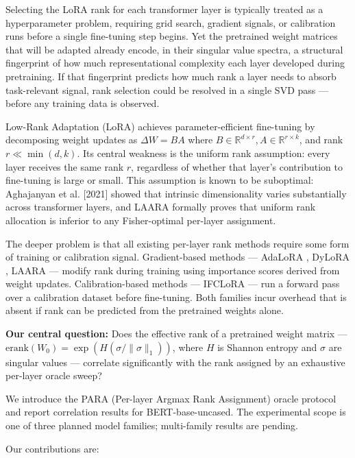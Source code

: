 
Selecting the LoRA rank for each transformer layer is typically treated as a hyperparameter problem, requiring grid search, gradient signals, or calibration runs before a single fine-tuning step begins. Yet the pretrained weight matrices that will be adapted already encode, in their singular value spectra, a structural fingerprint of how much representational complexity each layer developed during pretraining. If that fingerprint predicts how much rank a layer needs to absorb task-relevant signal, rank selection could be resolved in a single SVD pass --- before any training data is observed.

Low-Rank Adaptation (LoRA) \citep{Hu2022LoRA} achieves parameter-efficient fine-tuning by decomposing weight updates as $\Delta W = BA$ where $B \in \mathbb{R}^{d \times r}, A \in \mathbb{R}^{r \times k}$, and rank $r \ll \min(d, k)$. Its central weakness is the uniform rank assumption: every layer receives the same rank $r$, regardless of whether that layer's contribution to fine-tuning is large or small. This assumption is known to be suboptimal: Aghajanyan et al. [2021] showed that intrinsic dimensionality varies substantially across transformer layers, and LAARA \citep{Tripathi2026LAARA} formally proves that uniform rank allocation is inferior to any Fisher-optimal per-layer assignment.

The deeper problem is that all existing per-layer rank methods require some form of training or calibration signal. Gradient-based methods --- AdaLoRA \citep{Zhang2023AdaLoRA}, DyLoRA \citep{Valipour2022}, LAARA \citep{Tripathi2026LAARA} --- modify rank during training using importance scores derived from weight updates. Calibration-based methods --- IFCLoRA \citep{Zhang2026IFCLoRA} --- run a forward pass over a calibration dataset before fine-tuning. Both families incur overhead that is absent if rank can be predicted from the pretrained weights alone.

\textbf{Our central question:} Does the effective rank of a pretrained weight matrix --- $\text{erank}(W_0) = \exp(H(\sigma/\|\sigma\|_1))$, where $H$ is Shannon entropy and $\sigma$ are singular values --- correlate significantly with the rank assigned by an exhaustive per-layer oracle sweep?

We introduce the PARA (Per-layer Argmax Rank Assignment) oracle protocol and report correlation results for BERT-base-uncased. The experimental scope is one of three planned model families; multi-family results are pending.

Our contributions are:

